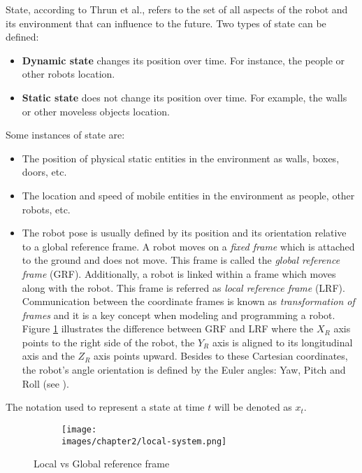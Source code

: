 State, according to Thrun et al.\cite{Thrun:2005:PR:1121596}, refers to the set of all aspects of the robot and its environment that can influence to the future. Two types of state can be defined:

\begin{itemize}
\item \textbf{Dynamic state} changes its position over time. For instance, the people or other robots location.
\item \textbf{Static state} does not change its position over time. For example, the walls or other moveless objects location.
\end{itemize}

Some instances of state are: 

\begin{itemize}
\item The position of physical static entities in the environment as walls, boxes, doors, etc.
\item The location and speed of mobile entities in the environment as people, other robots, etc.
\item The robot pose is usually defined by its position and its orientation relative to a global reference frame. A robot moves on a \textit{fixed frame} which is attached to the ground and does not move. This frame is called the \textit{global reference frame} (GRF). Additionally, a robot is linked within a frame which moves along with the robot. This frame is referred as \textit{local reference frame} (LRF). Communication between the coordinate frames is known as \textit{transformation of frames} and it is a key concept when modeling and programming a robot\cite{Reza:Theory-of-applied-robotics}. Figure \ref{fig:ch-2-global-local} illustrates the difference between GRF and LRF where the $X_R$ axis points to the right side of the robot, the $Y_R$ axis is aligned to its longitudinal axis and the $Z_R$ axis points upward. Besides to these Cartesian coordinates, the robot's angle orientation is defined by the Euler angles: Yaw, Pitch and Roll (see \cite{Cook:mobile-robots}). 
\end{itemize}

The notation used to represent a state at time $t$ will be denoted as $x_t$.

\begin{figure}[h!]
  \centering
  \begin{subfigure}[b]{0.5\linewidth}
  	\texttt{[image: \\images/chapter2/local-system.png]}
  \end{subfigure}
  \caption{Local vs Global reference frame}
  \label{fig:ch-2-global-local}
\end{figure}

